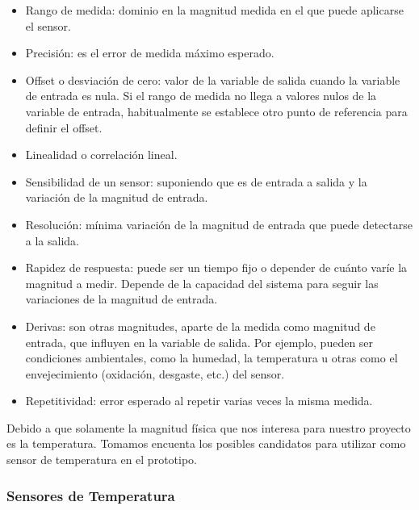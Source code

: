 \begin{itemize}
	
	\item Rango de medida: dominio en la magnitud medida en el que puede aplicarse el sensor.
	
	\item Precisión: es el error de medida máximo esperado.
	
	\item Offset o desviación de cero:  valor de la variable de salida cuando la variable de entrada es nula. Si el rango de medida no llega a valores nulos de la variable de entrada, habitualmente se establece otro punto de referencia para definir el offset.
	
	\item Linealidad o correlación lineal.
	
	\item Sensibilidad de un sensor: suponiendo que es de entrada a salida y la variación de la magnitud de entrada.
	
	\item Resolución: mínima variación de la magnitud de entrada que puede detectarse a la salida.
	
	\item Rapidez de respuesta: puede ser un tiempo fijo o depender de cuánto varíe la magnitud a medir. Depende de la capacidad del sistema para seguir las variaciones de la magnitud de entrada.
	
	\item Derivas: son otras magnitudes, aparte de la medida como magnitud de entrada, que influyen en la variable de salida. Por ejemplo, pueden ser condiciones ambientales, como la humedad, la temperatura u otras como el envejecimiento (oxidación, desgaste, etc.) del sensor.
	
	\item Repetitividad: error esperado al repetir varias veces la misma medida.
	
\end{itemize}

\par \noindent
Debido a que solamente la magnitud física que nos interesa para nuestro proyecto es la temperatura. Tomamos encuenta los posibles candidatos para utilizar como sensor de temperatura en el prototipo.

\clearpage

\subsubsection{Sensores de Temperatura}	


